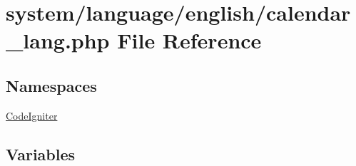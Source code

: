 \hypertarget{calendar__lang_8php}{}\section{system/language/english/calendar\+\_\+lang.php File Reference}
\label{calendar__lang_8php}
\subsection*{Namespaces}
\begin{DoxyCompactItemize}
\item 
 \mbox{\hyperlink{namespace_code_igniter}{Code\+Igniter}}
\end{DoxyCompactItemize}
\subsection*{Variables}
